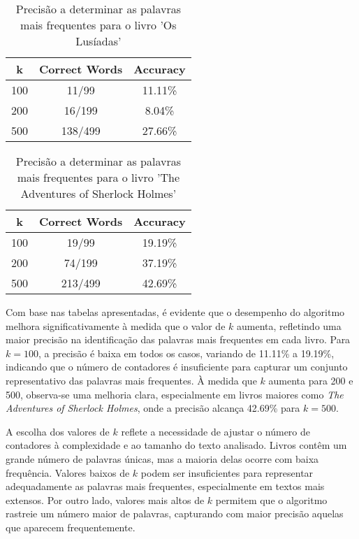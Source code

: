 \documentclass[shortpaper, portugues, times, mirror]{revdetua}
\begin{document}
\begin{table}[H]
\centering
\begin{tabular}{|c|c|c|}
\hline
\textbf{k} & \textbf{Correct Words} & \textbf{Accuracy} \\ \hline
100 & 11/99 & 11.11\% \\ \hline
200 & 16/199 & 8.04\% \\ \hline
500 & 138/499 & 27.66\% \\ \hline
\end{tabular}
\caption{Precisão a determinar as palavras mais frequentes para o livro 'Os Lusíadas'}
\label{tab:accuracy}
\end{table}

\begin{table}[H]
\centering
\begin{tabular}{|c|c|c|}
\hline
\textbf{k} & \textbf{Correct Words} & \textbf{Accuracy} \\ \hline
100 & 19/99 & 19.19\% \\ \hline
200 & 74/199 & 37.19\% \\ \hline
500 & 213/499 & 42.69\% \\ \hline
\end{tabular}
\caption{Precisão a determinar as palavras mais frequentes para o livro 'The Adventures of Sherlock Holmes'}
\label{tab:accuracy}
\end{table}

Com base nas tabelas apresentadas, é evidente que o desempenho do algoritmo melhora significativamente à medida que o valor de \(k\) aumenta, refletindo uma maior precisão na identificação das palavras mais frequentes em cada livro. Para \(k = 100\), a precisão é baixa em todos os casos, variando de 11.11\% a 19.19\%, indicando que o número de contadores é insuficiente para capturar um conjunto representativo das palavras mais frequentes. À medida que \(k\) aumenta para 200 e 500, observa-se uma melhoria clara, especialmente em livros maiores como \textit{The Adventures of Sherlock Holmes}, onde a precisão alcança 42.69\% para \(k = 500\).

A escolha dos valores de \(k\) reflete a necessidade de ajustar o número de contadores à complexidade e ao tamanho do texto analisado. Livros contêm um grande número de palavras únicas, mas a maioria delas ocorre com baixa frequência. Valores baixos de \(k\) podem ser insuficientes para representar adequadamente as palavras mais frequentes, especialmente em textos mais extensos. Por outro lado, valores mais altos de \(k\) permitem que o algoritmo rastreie um número maior de palavras, capturando com maior precisão aquelas que aparecem frequentemente.
\end{document}
